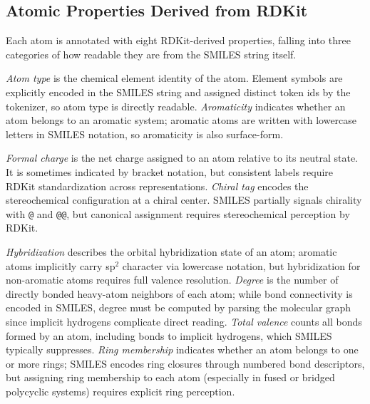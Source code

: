 
\subsection{Atomic Properties Derived from RDKit}
\label{appendix:properties}

Each atom is annotated with eight RDKit-derived properties, falling into three categories of how readable they are from the SMILES string itself.

\emph{Atom type} is the chemical element identity of the atom. Element symbols are explicitly encoded in the SMILES string and assigned distinct token ids by the tokenizer, so atom type is directly readable.
\emph{Aromaticity} indicates whether an atom belongs to an aromatic system; aromatic atoms are written with lowercase letters in SMILES notation, so aromaticity is also surface-form.

\emph{Formal charge} is the net charge assigned to an atom relative to its neutral state. It is sometimes indicated by bracket notation, but consistent labels require RDKit standardization across representations.
\emph{Chiral tag} encodes the stereochemical configuration at a chiral center. SMILES partially signals chirality with \texttt{@} and \texttt{@@}, but canonical assignment requires stereochemical perception by RDKit.

\emph{Hybridization} describes the orbital hybridization state of an atom; aromatic atoms implicitly carry sp$^2$ character via lowercase notation, but hybridization for non-aromatic atoms requires full valence resolution.
\emph{Degree} is the number of directly bonded heavy-atom neighbors of each atom; while bond connectivity is encoded in SMILES, degree must be computed by parsing the molecular graph since implicit hydrogens complicate direct reading.
\emph{Total valence} counts all bonds formed by an atom, including bonds to implicit hydrogens, which SMILES typically suppresses.
\emph{Ring membership} indicates whether an atom belongs to one or more rings; SMILES encodes ring closures through numbered bond descriptors, but assigning ring membership to each atom (especially in fused or bridged polycyclic systems) requires explicit ring perception.

